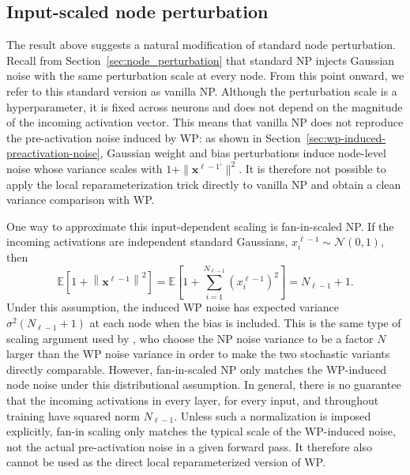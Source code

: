 \subsection{Input-scaled node perturbation}

The result above suggests a natural modification of standard node perturbation. Recall from Section~\ref{sec:node_perturbation} that standard NP injects Gaussian noise with the same perturbation scale at every node. From this point onward, we refer to this standard version as vanilla NP. Although the perturbation scale is a hyperparameter, it is fixed across neurons and does not depend on the magnitude of the incoming activation vector. This means that vanilla NP does not reproduce the pre-activation noise induced by WP: as shown in Section~\ref{sec:wp-induced-preactivation-noise}, Gaussian weight and bias perturbations induce node-level noise whose variance scales with \(1+\|\mathbf{x}^{\ell-1'}\|^2\). It is therefore not possible to apply the local reparameterization trick directly to vanilla NP and obtain a clean variance comparison with WP.

One way to approximate this input-dependent scaling is fan-in-scaled NP. If the incoming activations are independent standard Gaussians, $x_i^{\ell-1} \sim \mathcal{N}(0,1)$, then
\begin{equation}
\mathbb{E}\!\left[1+\left\|\mathbf{x}^{\ell-1}\right\|^2\right]
=
\mathbb{E}\!\left[1+\sum_{i=1}^{N_{\ell-1}} (x_i^{\ell-1})^2\right]
=
N_{\ell-1}+1.
\label{eq:fanin_expected_input_norm}
\end{equation}
Under this assumption, the induced WP noise has expected variance $\sigma^2 (N_{\ell-1}+1)$ at each node when the bias is included. This is the same type of scaling argument used by \textcite{werfel_learning_2003}, who choose the NP noise variance to be a factor $N$ larger than the WP noise variance in order to make the two stochastic variants directly comparable. However, fan-in-scaled NP only matches the WP-induced node noise under this distributional assumption. In general, there is no guarantee that the incoming activations in every layer, for every input, and throughout training have squared norm \(N_{\ell-1}\). Unless such a normalization is imposed explicitly, fan-in scaling only matches the typical scale of the WP-induced noise, not the actual pre-activation noise in a given forward pass. It therefore also cannot be used as the direct local reparameterized version of WP.

